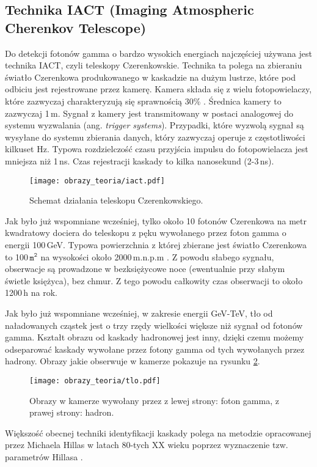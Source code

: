 \documentclass[a4paper,11pt,twoside]{article}
\begin{document}
\subsection{Technika IACT (Imaging Atmospheric Cherenkov Telescope)}
Do detekcji fotonów gamma o bardzo wysokich energiach najczęściej używana jest technika IACT, czyli teleskopy Czerenkowskie. Technika ta polega na zbieraniu światło Czerenkowa produkowanego w kaskadzie na dużym lustrze, które pod odbiciu jest rejestrowane przez kamerę. Kamera składa się z wielu fotopowielaczy, które zazwyczaj charakteryzują się sprawnością 30\% \cite{particle_de_angelis}. Średnica kamery to zazwyczaj 1\,m. Sygnał z kamery jest transmitowany w postaci analogowej do systemu wyzwalania (ang. \textsl{trigger systems}). Przypadki, które wyzwolą sygnał są wysyłane do systemu zbierania danych, który zazwyczaj operuje z częstotliwości kilkuset Hz. Typowa rozdzielczość czasu przyjścia impulsu do fotopowielacza jest mniejsza niż 1\,ns. Czas rejestracji kaskady to kilka nanosekund (2-3\,ns).
\begin{figure}[H] 
\centering
\texttt{[image: obrazy\_teoria/iact.pdf]}
\caption{Schemat działania teleskopu Czerenkowskiego.}
\label{fig:kamera}
\end{figure}
Jak było już wspomniane wcześniej, tylko około 10 fotonów Czerenkowa na metr kwadratowy dociera do teleskopu z pęku wywołanego przez foton gamma o energii 100\,GeV. Typowa powierzchnia z której zbierane jest światło Czerenkowa to 100\,$\mathtt{m^2}$ na wysokości około 2000\,m.n.p.m \cite{particle_de_angelis}. Z powodu słabego sygnału, obserwacje są prowadzone w bezksiężycowe noce (ewentualnie przy słabym świetle księżyca), bez chmur. Z tego powodu całkowity czas obserwacji to około 1200\,h na rok.

Jak było już wspomniane wcześniej, w zakresie energii GeV-TeV, tło od naładowanych cząstek jest o trzy rzędy wielkości większe niż sygnał od fotonów gamma. Kształt obrazu od kaskady hadronowej jest inny, dzięki czemu możemy odseparować kaskady wywołane przez fotony gamma od tych wywołanych przez hadrony. Obrazy jakie obserwuje w kamerze pokazuje na rysunku \ref{fig:kamera}.
\begin{figure}[H] 
\centering
\texttt{[image: obrazy\_teoria/tlo.pdf]}
\caption{Obrazy w kamerze wywołany przez z lewej strony: foton gamma, z prawej strony: hadron.}
\label{fig:kamera}
\end{figure}
Większość obecnej techniki identyfikacji kaskady polega na metodzie opracowanej przez Michaela Hillas w latach 80-tych XX wieku poprzez wyznaczenie tzw. parametrów Hillasa \cite{hilas}.
\end{document}
